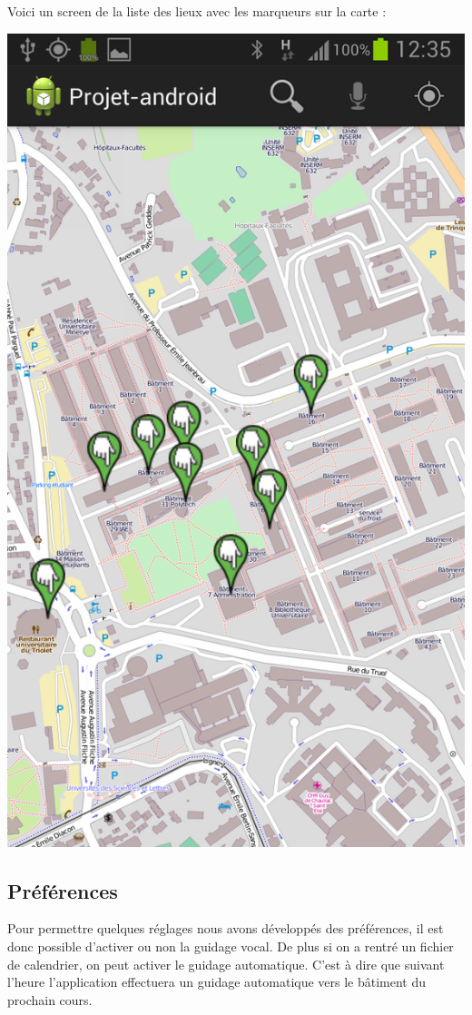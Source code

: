 \documentclass{article}
\begin{document}
	Voici un screen de la liste des lieux avec les marqueurs sur la carte :
	\begin{center}
		\includegraphics[scale=0.25]{marqueurs.png}
	\end{center}
	
	\subsection{Préférences}
	Pour permettre quelques réglages nous avons développés des préférences, il est donc possible d'activer ou non la guidage vocal. 
	De plus si on a rentré un fichier de calendrier, on peut activer le guidage automatique. C'est à dire que suivant l'heure l'application effectuera un guidage automatique vers le bâtiment du prochain cours. \\
	
\end{document}

